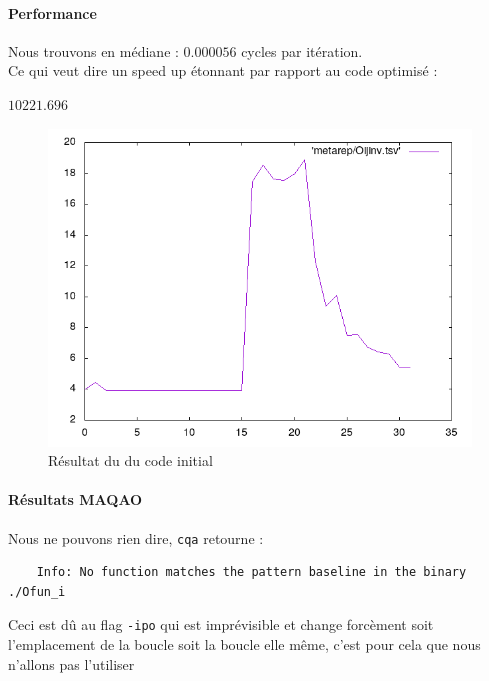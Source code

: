 \documentclass{report}
\begin{document}
  \paragraph{Performance}
  Nous trouvons en médiane : $0.000056$ cycles par itération.\\
  Ce qui veut dire un speed up étonnant par rapport au code optimisé :
  \begin{center}
      $10221.696$
  \end{center}
  \begin{figure}[ht!]
    \centering
    \includegraphics[scale=0.45]{../metarep/Oijinv.png}
    \caption{Résultat du du code initial}
  \end{figure}
  \paragraph{Résultats MAQAO}
  Nous ne pouvons rien dire, \texttt{cqa} retourne :
  \begin{verbatim}
    Info: No function matches the pattern baseline in the binary ./Ofun_i
  \end{verbatim}
  Ceci est dû au flag \texttt{-ipo} qui est imprévisible et change forcèment
  soit l'emplacement de la boucle soit la boucle elle même, c'est pour cela que nous n'allons pas l'utiliser
\end{document}
